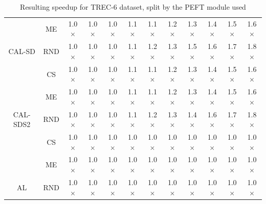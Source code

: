 \begin{table}[htbp]
\begin{subtable}{\linewidth}
\begin{tabular}{c|c|cccccccccc}
 & ME & 1.0$\times$ & 1.0$\times$ & 1.0$\times$ & 1.1$\times$ & 1.1$\times$ & 1.2$\times$ & 1.3$\times$ & 1.4$\times$ & 1.5$\times$ & 1.6$\times$\\

\multirow{-3}{*}{\raggedright\arraybackslash CAL-SD} & RND & 1.0$\times$ & 1.0$\times$ & 1.0$\times$ & 1.1$\times$ & 1.2$\times$ & 1.3$\times$ & 1.5$\times$ & 1.6$\times$ & 1.7$\times$ & 1.8$\times$\\
\midrule
 & CS & 1.0$\times$ & 1.0$\times$ & 1.0$\times$ & 1.1$\times$ & 1.1$\times$ & 1.2$\times$ & 1.3$\times$ & 1.4$\times$ & 1.5$\times$ & 1.6$\times$\\

 & ME & 1.0$\times$ & 1.0$\times$ & 1.0$\times$ & 1.1$\times$ & 1.1$\times$ & 1.2$\times$ & 1.3$\times$ & 1.4$\times$ & 1.5$\times$ & 1.6$\times$\\

\multirow{-3}{*}{\raggedright\arraybackslash CAL-SDS2} & RND & 1.0$\times$ & 1.0$\times$ & 1.0$\times$ & 1.1$\times$ & 1.2$\times$ & 1.3$\times$ & 1.4$\times$ & 1.6$\times$ & 1.7$\times$ & 1.8$\times$\\
\midrule
 & CS & 1.0$\times$ & 1.0$\times$ & 1.0$\times$ & 1.0$\times$ & 1.0$\times$ & 1.0$\times$ & 1.0$\times$ & 1.0$\times$ & 1.0$\times$ & 1.0$\times$\\

 & ME & 1.0$\times$ & 1.0$\times$ & 1.0$\times$ & 1.0$\times$ & 1.0$\times$ & 1.0$\times$ & 1.0$\times$ & 1.0$\times$ & 1.0$\times$ & 1.0$\times$\\

\multirow{-3}{*}{\raggedright\arraybackslash AL} & RND & 1.0$\times$ & 1.0$\times$ & 1.0$\times$ & 1.0$\times$ & 1.0$\times$ & 1.0$\times$ & 1.0$\times$ & 1.0$\times$ & 1.0$\times$ & 1.0$\times$\\
\bottomrule
\end{tabular}
\end{subtable}
\caption{Resulting speedup for TREC-6 dataset, split by the PEFT module used}
\label{tab:speedup_short_trec_10}
\end{table}
